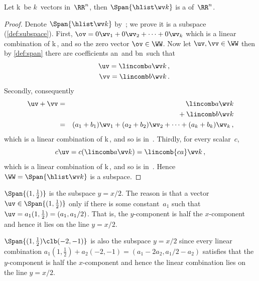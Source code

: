 \begin{theorem} \label{thm:spansubs} 
Let \hlist\wv k\ be \(k\)~vectors in~\(\RR^n\),
then \(\Span\{\hlist\wv k\}\) is a  of~\(\RR^n\).
\end{theorem}

\begin{proof}
Denote \(\Span\{\hlist\wv k\}\) by~\WW; we prove it is a subspace (\cref{def:subspace}).
First, \(\ov=0\wv_1+0\wv_2+\cdots+0\wv_k\) which is a linear combination of \hlist\wv k\,, and so the zero vector \(\ov\in\WW\).
Now let \(\uv,\vv\in\WW\) then by \cref{def:span} there are coefficients \hlist an\ and \hlist bn\ such that
\begin{eqnarray*}
&&\uv=\lincomb a\wv k\,,
\\&&\vv=\lincomb b\wv k\,.
\end{eqnarray*}
Secondly, consequently
\begin{eqnarray*}
\uv+\vv&=&
\lincomb a\wv k
\\&&{}+\lincomb b\wv k
\\&=&(a_1+b_1)\wv_1+(a_2+b_2)\wv_2+\cdots+(a_k+b_k)\wv_k\,,
\end{eqnarray*}
which is a linear combination of \hlist\wv k\,, and so is in~\WW.
Thirdly, for every scalar~\(c\),
\begin{equation*}
c\uv=c(\lincomb a\wv k)
=\lincomb {ca}\wv k\,,
\end{equation*}
which is a linear combination of \hlist\wv k\,, and so is in~\WW.
Hence \(\WW=\Span\{\hlist\wv k\}\) is a subspace.
\end{proof}


\begin{example} \label{eg:1x2subs}
\(\Span\{(1,\frac12)\}\) is the subspace \(y=x/2\).
The reason is that a vector \(\uv\in\Span\{(1,\frac12)\}\) only if there is some constant~\(a_1\) such that \(\uv=a_1(1,\frac12)=(a_1,a_1/2)\).
That is, the \(y\)-component is half the \(x\)-component and hence it lies on the line \(y=x/2\).

\(\Span\{(1,\frac12)\clb (-2,-1)\}\) is also the subspace \(y=x/2\) since every linear combination \(a_1(1,\frac12)+a_2(-2,-1)=(a_1-2a_2,a_1/2-a_2)\) satisfies that the \(y\)-component is half the \(x\)-component and hence the linear combination lies on the line \(y=x/2\).
\end{example}

